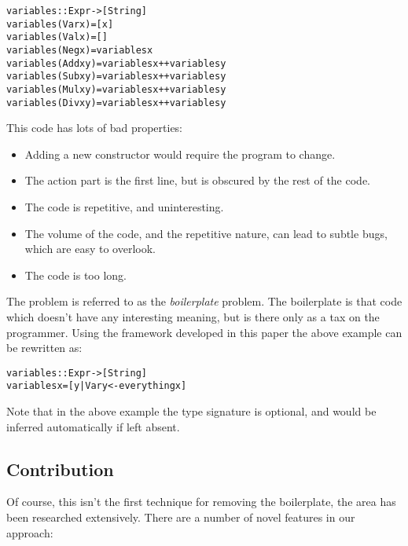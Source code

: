 \documentclass[preprint]{sigplanconf}
\newenvironment{code}{\begin{alltt}\small}{\end{alltt}}
\begin{document}
\begin{code}
variables :: Expr -> [String]
variables (Var  x    ) = [x]
variables (Val  x    ) = []
variables (Neg  x    ) = variables x
variables (Add  x y  ) = variables x ++ variables y
variables (Sub  x y  ) = variables x ++ variables y
variables (Mul  x y  ) = variables x ++ variables y
variables (Div  x y  ) = variables x ++ variables y
\end{code}

This code has lots of bad properties:

\begin{itemize}
\item Adding a new constructor would require the program to change.
\item The action part is the first line, but is obscured by the rest of the code.
\item The code is repetitive, and uninteresting.
\item The volume of the code, and the repetitive nature, can lead to subtle bugs, which are easy to overlook.
\item The code is too long.
\end{itemize}

The problem is referred to as the \textit{boilerplate} problem. The boilerplate is that code which doesn't have any interesting meaning, but is there only as a tax on the programmer. Using the framework developed in this paper the above example can be rewritten as:

\begin{code}
variables :: Expr -> [String]
variables x = [y | Var y <- everything x]
\end{code}

Note that in the above example the type signature is optional, and would be inferred automatically if left absent.

\subsection{Contribution}

Of course, this isn't the first technique for removing the boilerplate, the area has been researched extensively. There are a number of novel features in our approach:
\end{document}
